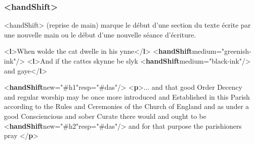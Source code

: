 \documentclass[]{beamer}\makeatletter
\begin{document}
\begin{frame}[fragile]
\frametitle{{\color{blue2}<handShift>}}\par
      {\color{blue2}<handShift>} (reprise de main) marque le début d’une section du      texte écrite par une nouvelle main ou le début d’une nouvelle séance      d’écriture.
\bgroup\ttfamily\fontsize{8.5pt}{9pt}\selectfont\par
\begin{exampleblock}{}
\noindent\ttfamily\mbox{}{\color{blue1}<\textbf{l}>}When wolde the cat dwelle in his ynne{\color{blue1}</\textbf{l}>}\mbox{}\newline 
{\color{blue1}<\textbf{handShift}\hspace*{6pt}medium="{\color{blue2}greenish-ink}"/>}\mbox{}\newline 
{\color{blue1}<\textbf{l}>}And if the cattes skynne be slyk {\color{blue1}<\textbf{handShift}\hspace*{6pt}medium="{\color{blue2}black-ink}"/>}\mbox{}\newline 
 and gaye{\color{blue1}</\textbf{l}>}
\end{exampleblock}
\par\egroup
  
\bgroup\ttfamily\fontsize{8.5pt}{9pt}\selectfont\par
\begin{exampleblock}{}
\noindent\ttfamily\mbox{}{\color{blue1}<\textbf{handShift}\hspace*{6pt}new="{\color{blue2}#h1}"\hspace*{6pt}resp="{\color{blue2}#das}"/>}\mbox{}\newline 
{\color{blue1}<\textbf{p}>}... and that good Order Decency and regular worship may be once\mbox{}\newline 
 more introduced and Established in this Parish according to the\mbox{}\newline 
 Rules and Ceremonies of the Church of England and as under a good\mbox{}\newline 
 Consciencious and sober Curate there would and ought to be\mbox{}\newline 
{\color{blue1}<\textbf{handShift}\hspace*{6pt}new="{\color{blue2}#h2}"\hspace*{6pt}resp="{\color{blue2}#das}"/>} and for that purpose the\mbox{}\newline 
 parishioners pray {\color{blue1}</\textbf{p}>}
\end{exampleblock}
\par\egroup
  
\end{frame}
\end{document}
